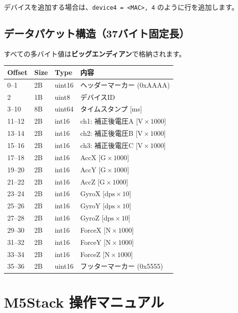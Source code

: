 \documentclass[a4paper,10pt]{ltjsarticle}
\begin{document}
デバイスを追加する場合は、\texttt{device4 = <MAC>, 4} のように行を追加します。

\subsection{データパケット構造（37バイト固定長）}

すべての多バイト値は\textbf{ビッグエンディアン}で格納されます。

\begin{table}[h]
\centering
\small
\begin{tabular}{llll}
\toprule
\textbf{Offset} & \textbf{Size} & \textbf{Type} & \textbf{内容} \\
\midrule
0--1   & 2B & uint16 & ヘッダーマーカー (0xAAAA) \\
2      & 1B & uint8  & デバイスID \\
3--10  & 8B & uint64 & タイムスタンプ [ms] \\
11--12 & 2B & int16  & ch1: 補正後電圧A [$\mathrm{V} \times 1000$] \\
13--14 & 2B & int16  & ch2: 補正後電圧B [$\mathrm{V} \times 1000$] \\
15--16 & 2B & int16  & ch3: 補正後電圧C [$\mathrm{V} \times 1000$] \\
17--18 & 2B & int16  & AccX [$\mathrm{G} \times 1000$] \\
19--20 & 2B & int16  & AccY [$\mathrm{G} \times 1000$] \\
21--22 & 2B & int16  & AccZ [$\mathrm{G} \times 1000$] \\
23--24 & 2B & int16  & GyroX [$\mathrm{dps} \times 10$] \\
25--26 & 2B & int16  & GyroY [$\mathrm{dps} \times 10$] \\
27--28 & 2B & int16  & GyroZ [$\mathrm{dps} \times 10$] \\
29--30 & 2B & int16  & ForceX [$\mathrm{N} \times 1000$] \\
31--32 & 2B & int16  & ForceY [$\mathrm{N} \times 1000$] \\
33--34 & 2B & int16  & ForceZ [$\mathrm{N} \times 1000$] \\
35--36 & 2B & uint16 & フッターマーカー (0x5555) \\
\bottomrule
\end{tabular}
\end{table}

\newpage

\section{M5Stack 操作マニュアル}
\end{document}
